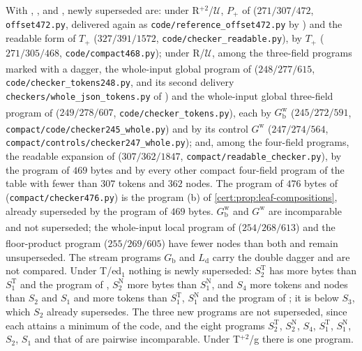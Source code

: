 With , ,  and
, newly superseded are: under R$^{+2}$/$\mathcal U$,
$P_{+}$ of  ($271/307/472$, \texttt{offset472.py}, delivered again
as \texttt{code/reference\_offset472.py} by ) and the
readable form of $T_{+}$ ($327/391/1572$, \texttt{code/checker\_readable.py}), by
$T_{+}$ ($271/305/468$, \texttt{code/compact468.py}); under R/$\mathcal U$, among
the three-field programs marked with a dagger, the whole-input global program of
 ($248/277/615$\textsuperscript{\dag},
\texttt{code/checker\_tokens248.py}, and its second delivery
\texttt{checkers/whole\_json\_tokens.py} of ) and the
whole-input global three-field program of 
($249/278/607$\textsuperscript{\dag}, \texttt{code/checker\_tokens.py}), each by
$G^{\mathrm w}_{\mathrm b}$ ($245/272/591$\textsuperscript{\dag},
\texttt{compact/code/checker245\_whole.py}) and by its control $G^{\mathrm w}$
($247/274/564$\textsuperscript{\dag}, \texttt{compact/controls/checker247\_whole.py});
and, among the four-field programs, the readable expansion of
 ($307/362/1847$, \texttt{compact/readable\_checker.py}),
by the program of $469$ bytes and by every other compact four-field program of
the table with fewer than $307$ tokens and $362$ nodes. The program of $476$
bytes of  (\texttt{compact/checker476.py}) is the
program (b) of \cref{cert:prop:leaf-compositions}, already superseded by the
program of $469$ bytes. $G^{\mathrm w}_{\mathrm b}$ and $G^{\mathrm w}$ are
incomparable and not superseded; the whole-input local program of
 ($254/268/613$\textsuperscript{\dag}) and the
floor-product program ($255/269/605$\textsuperscript{\dag}) have fewer nodes than
both and remain unsuperseded. The stream programs $G_{\mathrm b}$ and
$L_{\mathrm d}$ carry the double dagger and are not compared. Under T/ed$_1$
nothing is newly superseded: $S^{\mathrm T}_2$ has more bytes than
$S^{\mathrm T}_1$ and the program of , $S^{\mathrm N}_2$ more
bytes than $S^{\mathrm N}_1$, and $S_4$ more tokens and nodes than $S_2$ and $S_1$
and more tokens than $S^{\mathrm T}_1$, $S^{\mathrm N}_1$ and the program of
; it is below $S_3$, which $S_2$ already supersedes. The three new
programs are not superseded, since each attains a minimum of the code, and the
eight programs $S^{\mathrm T}_2$, $S^{\mathrm N}_2$, $S_4$, $S^{\mathrm T}_1$,
$S^{\mathrm N}_1$, $S_2$, $S_1$ and that of  are pairwise
incomparable. Under T$^{+2}$/g there is one program.

